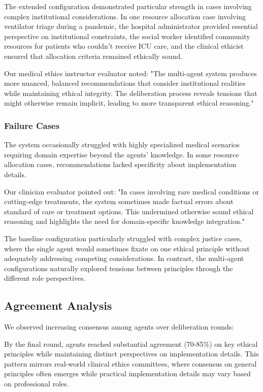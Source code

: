 \documentclass[11pt]{article}
\begin{document}
The extended configuration demonstrated particular strength in cases involving complex institutional considerations. In one resource allocation case involving ventilator triage during a pandemic, the hospital administrator provided essential perspective on institutional constraints, the social worker identified community resources for patients who couldn't receive ICU care, and the clinical ethicist ensured that allocation criteria remained ethically sound.

Our medical ethics instructor evaluator noted: "The multi-agent system produces more nuanced, balanced recommendations that consider institutional realities while maintaining ethical integrity. The deliberation process reveals tensions that might otherwise remain implicit, leading to more transparent ethical reasoning."

\subsubsection{Failure Cases}

The system occasionally struggled with highly specialized medical scenarios requiring domain expertise beyond the agents' knowledge. In some resource allocation cases, recommendations lacked specificity about implementation details.

Our clinician evaluator pointed out: "In cases involving rare medical conditions or cutting-edge treatments, the system sometimes made factual errors about standard of care or treatment options. This undermined otherwise sound ethical reasoning and highlights the need for domain-specific knowledge integration."

The baseline configuration particularly struggled with complex justice cases, where the single agent would sometimes fixate on one ethical principle without adequately addressing competing considerations. In contrast, the multi-agent configurations naturally explored tensions between principles through the different role perspectives.

\subsection{Agreement Analysis}

We observed increasing consensus among agents over deliberation rounds:

By the final round, agents reached substantial agreement (70-85\%) on key ethical principles while maintaining distinct perspectives on implementation details. This pattern mirrors real-world clinical ethics committees, where consensus on general principles often emerges while practical implementation details may vary based on professional roles.
\end{document}
